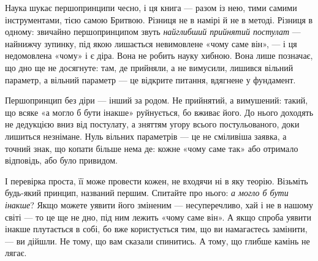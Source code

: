 \documentclass[12pt, a4paper, openany]{book}
\begin{document}
Наука шукає першопринципи чесно, і ця книга --- разом із нею, тими самими інструментами, тією самою Бритвою. Різниця не в намірі й не в методі. Різниця в одному: звичайно першопринципом звуть \emph{найглибший прийнятий постулат} --- найнижчу зупинку, під якою лишається невимовлене «чому саме він», --- і ця недомовлена «чому» і є діра. Вона не робить науку хибною. Вона лише позначає, що дно ще не досягнуте: там, де прийняли, а не вимусили, лишився вільний параметр, а вільний параметр --- це відкрите питання, вдягнене у фундамент.

Першопринцип без діри --- інший за родом. Не прийнятий, а вимушений: такий, що всяке «а могло б бути інакше» руйнується, бо вживає його. До нього доходять не дедукцією вниз від постулату, а зняттям угору всього постульованого, доки лишиться незнімане. Нуль вільних параметрів --- це не сміливіша заявка, а точний знак, що копати більше нема де: кожне «чому саме так» або отримало відповідь, або було привидом.

І перевірка проста, її може провести кожен, не входячи ні в яку теорію. Візьміть будь-який принцип, названий першим. Спитайте про нього: \emph{а могло б бути інакше}? Якщо можете уявити його зміненим --- несуперечливо, хай і не в нашому світі --- то це ще не дно, під ним лежить «чому саме він». А якщо спроба уявити інакше плутається в собі, бо вже користується тим, що ви намагаєтесь замінити, --- ви дійшли. Не тому, що вам сказали спинитись. А тому, що глибше камінь не лягає.
\end{document}
